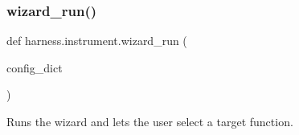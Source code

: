 \subsubsection{\texorpdfstring{wizard\+\_\+run()}{wizard\_run()}}
{\footnotesize\ttfamily def harness.\+instrument.\+wizard\+\_\+run (\begin{DoxyParamCaption}\item[{}]{config\+\_\+dict }\end{DoxyParamCaption})}

\begin{DoxyVerb}Runs the wizard and lets the user select a target function.
\end{DoxyVerb}
 